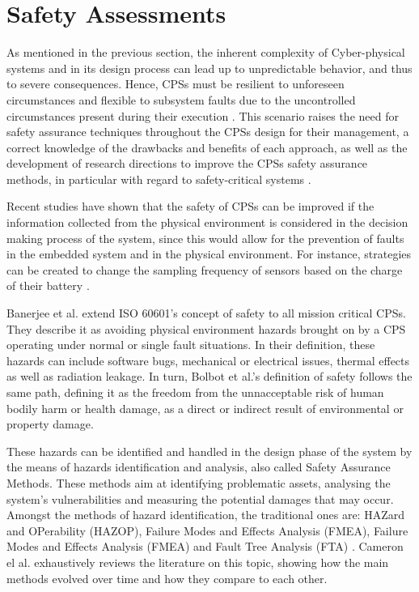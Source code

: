 \section{Safety Assessments}

As mentioned in the previous section, the inherent complexity of Cyber-physical systems and in its design process can lead up to unpredictable behavior, and thus to severe consequences. Hence, CPSs must be resilient to unforeseen circumstances and flexible to subsystem faults due to the uncontrolled circumstances present during their execution \cite{lee2008cyber}. This scenario raises the need for safety assurance techniques throughout the CPSs design for their management, a correct knowledge of the drawbacks and benefits of each approach, as well as the development of research directions to improve the CPSs safety assurance methods, in particular with regard to safety-critical systems \cite{bolbot2019vulnerabilities}.

Recent studies \cite{banerjee2011ensuring} have shown that the safety of CPSs can be improved if the information collected from the physical environment is considered in the decision making process of the system, since this would allow for the prevention of faults in the embedded system and in the physical environment. For instance, strategies can be created to change the sampling frequency of sensors based on the charge of their battery \cite{2021BSN}.

Banerjee et al. \cite{banerjee2011ensuring} extend ISO 60601's concept of safety to all mission critical CPSs. They describe it as avoiding physical environment hazards brought on by a CPS operating under normal or single fault situations. In their definition, these hazards can include software bugs, mechanical or electrical issues, thermal effects as well as radiation leakage. In turn, Bolbot et al.'s definition of safety \cite{bolbot2019vulnerabilities} follows the same path, defining it as the freedom from the unnacceptable risk of human bodily harm or health damage, as a direct or indirect result of environmental or property damage.

These hazards can be identified and handled in the design phase of the system \cite{bolbot2019vulnerabilities} by the means of hazards identification and analysis, also called Safety Assurance Methods. These methods aim at identifying problematic assets, analysing the system's vulnerabilities and measuring the potential damages that may occur. Amongst the methods of hazard identification, the traditional ones are: HAZard and OPerability (HAZOP), Failure Modes and Effects Analysis (FMEA), Failure Modes and Effects Analysis (FMEA) and Fault Tree Analysis (FTA) \cite{bolbot2020novel}. Cameron el al. \cite{cameron2017process} exhaustively reviews the literature on this topic, showing how the main methods evolved over time and how they compare to each other.

